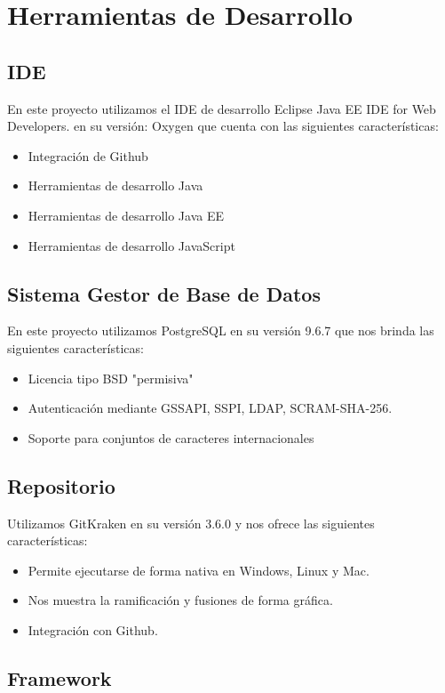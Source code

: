 \section{Herramientas de Desarrollo }
\subsection{IDE}
En este proyecto utilizamos el IDE de desarrollo Eclipse Java EE IDE for Web Developers. 
en su versión: Oxygen que cuenta con las siguientes características:  
\begin{itemize}
\item Integración de Github 

\item Herramientas de desarrollo Java 

\item Herramientas de desarrollo Java EE 

\item Herramientas de desarrollo JavaScript 
\end{itemize}
\subsection{Sistema Gestor de Base de Datos}
En este proyecto utilizamos PostgreSQL en su versión 9.6.7 que nos brinda las siguientes características: 
\begin{itemize}
\item Licencia tipo BSD "permisiva" 
\item Autenticación mediante GSSAPI, SSPI, LDAP, SCRAM-SHA-256. 
\item Soporte para conjuntos de caracteres internacionales 
\end{itemize}
\subsection{Repositorio}
Utilizamos GitKraken en su versión 3.6.0 y nos ofrece las siguientes características:  
\begin{itemize}
\item Permite ejecutarse de forma nativa en Windows, Linux y Mac.
\item Nos muestra la ramificación y fusiones de forma gráfica.
\item Integración con Github.
\end{itemize}
\subsection{Framework} 

